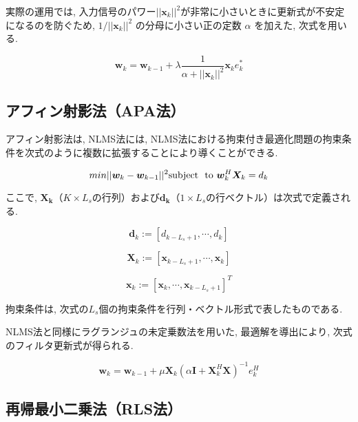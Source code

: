 実際の運用では, 入力信号のパワー\(||\bm{x}_k||^2\)が非常に小さいときに更新式が不安定になるのを防ぐため, \(
1 / ||{}\bm{x}_k||^2 \)
の分母に小さい正の定数 \(\alpha\) を加えた, 次式を用いる. 

\begin{equation}
\bm{w}_k = \bm{w}_{k-1} + \lambda \frac{1}{\alpha + ||\bm{x}_k||^2} \bm{x}_k e_k^*
\end{equation}

\subsection{アフィン射影法（APA法）}\label{apa}

アフィン射影法は, NLMS法には, NLMS法における拘束付き最適化問題の拘束条件を次式のように複数に拡張することにより導くことができる. 

\begin{equation}
min ||\bm{w}_k - \bm{w}_{k-1}||^2 \\ 
\mbox{subject \ to} \ \bm{w}_k^H \bm{X}_k = d_k
\end{equation}


ここで, \(\bm{X_k}\)（\(K \times L_s\)の行列）および\(\bm{d_k}\)（\(1 \times L_s\)の行ベクトル）は次式で定義される. 


\begin{equation}
\bm{d}_k := [d_{k-L_s+1}, \cdots, d_k]
\end{equation}

\begin{equation}
\bm{X}_k := [\bm{x}_{k-L_s+1}, \cdots, \bm{x}_k]
\end{equation}

\begin{equation}
\bm{x}_k := [\bm{x}_{k}, \cdots, \bm{x}_{k-L_s+1}]^T
\end{equation}

拘束条件は, 次式の\(L_s\)個の拘束条件を行列・ベクトル形式で表したものである. 

NLMS法と同様にラグランジュの未定乗数法を用いた, 最適解を導出により, 次式のフィルタ更新式が得られる. 

\begin{equation}
\bm{w}_k = \bm{w}_{k-1} + \mu \bm{X}_k ( \alpha \bm{I} + \bm{X}_k^H \bm{X} )^{-1} e_k^H
\end{equation}



\subsection{再帰最小二乗法（RLS法）}\label{rls}

